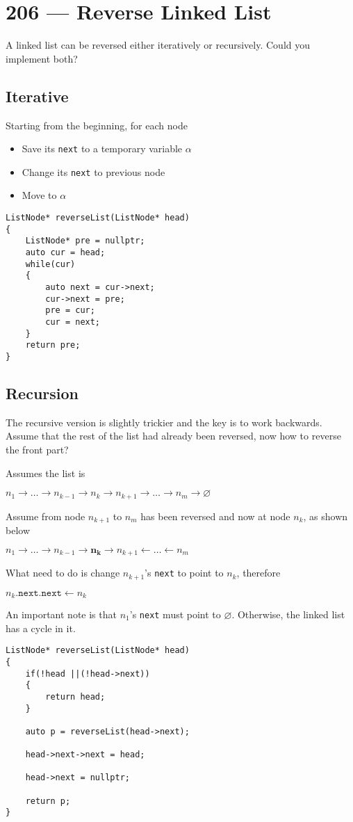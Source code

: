 \section{206 --- Reverse Linked List}
A linked list can be reversed either iteratively or recursively. Could you implement both?
\subsection{Iterative}
Starting from the beginning, for each node
\begin{itemize}
    \item Save its \texttt{next} to a temporary variable $\alpha$
    \item Change its \texttt{next} to previous node
    \item Move to $\alpha$
\end{itemize}
\setcounter{lstlisting}{0}
\begin{lstlisting}[style=customc, caption={Iterative}]
ListNode* reverseList(ListNode* head)
{
    ListNode* pre = nullptr;
    auto cur = head;
    while(cur)
    {
        auto next = cur->next;
        cur->next = pre;
        pre = cur;
        cur = next;
    }
    return pre;
}
\end{lstlisting}
\subsection{Recursion}
The recursive version is slightly trickier and the key is to work backwards. Assume that the rest of the list had already been reversed, now how to reverse the front part?

Assumes the list is 

$n_1\to\ldots\to n_{k-1}\to n_k\to n_{k+1}\to\ldots\to n_m\to \varnothing$

Assume from node $n_{k+1}$ to $n_m$ has been reversed and now at node $n_{k}$, as shown below

$n_1\to\ldots\to n_{k-1}\to \mathbf{n_k}\to n_{k+1}\longleftarrow\ldots\longleftarrow n_m$

What need to do is change $n_{k+1}$'s \texttt{next} to point to $n_k$, therefore

$n_k.\texttt{next}.\texttt{next}\gets n_k$

An important note is that $n_1$'s \texttt{next} must point to $\varnothing$. Otherwise, the linked list has a cycle in it.
\begin{lstlisting}[style=customc, caption={Recursion}]
ListNode* reverseList(ListNode* head)
{
    if(!head ||(!head->next))
    {
        return head;
    }
    
    auto p = reverseList(head->next);
    
    head->next->next = head;
    
    head->next = nullptr;
    
    return p;
}
\end{lstlisting}